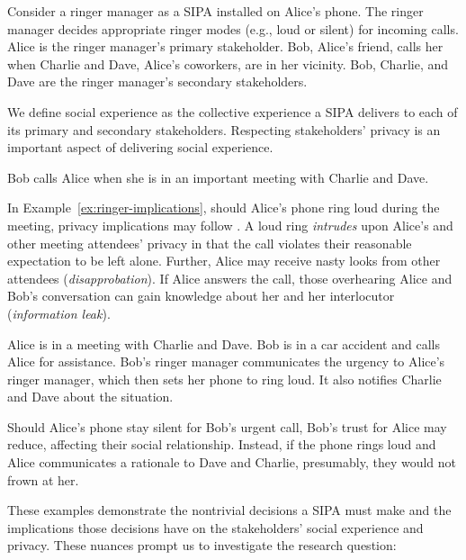 \begin{example} \label{ex:ringer-meeting} Consider a ringer manager as a
SIPA installed on Alice's phone. The ringer manager decides appropriate
ringer modes (e.g., loud or silent) for incoming calls. Alice is the
ringer manager's primary stakeholder. Bob, Alice's friend, calls her
when Charlie and Dave, Alice's coworkers, are in her vicinity. Bob,
Charlie, and Dave are the ringer manager's secondary stakeholders.
\end{example}


We define social experience as the collective experience a SIPA delivers
to each of its primary and secondary stakeholders. Respecting
stakeholders' privacy is an important aspect of delivering social
experience.

\begin{example} \label{ex:ringer-implications} Bob calls Alice when she
is in an important meeting with Charlie and Dave. \end{example}

In Example~\ref{ex:ringer-implications}, should Alice's phone ring loud
during the meeting, privacy implications may follow
\citep{solove-2006-taxonomy,Murukannaiah-IC16-Engineering}. A loud ring
\emph{intrudes} upon Alice's and other meeting attendees' privacy in
that the call violates their reasonable expectation to be left alone.
Further, Alice may receive nasty looks from other attendees
(\emph{disapprobation}). If Alice answers the call, those overhearing
Alice and Bob's conversation can gain knowledge about her and her
interlocutor (\emph{information leak}).

\begin{example} \label{ex:ringer-accident} Alice is in a meeting with
Charlie and Dave. Bob is in a car accident and calls Alice for
assistance. Bob's ringer manager communicates the urgency to Alice's
ringer manager, which then sets her phone to ring loud. It also notifies
Charlie and Dave about the situation. \end{example}

Should Alice's phone stay silent for Bob's urgent call, Bob's trust for
Alice may reduce, affecting their social relationship. Instead, if the
phone rings loud and Alice communicates a rationale to Dave and Charlie,
presumably, they would not frown at her.

These examples demonstrate the nontrivial decisions a SIPA must make and
the implications those decisions have on the stakeholders' social
experience and privacy. These nuances prompt us to investigate the
research question:

